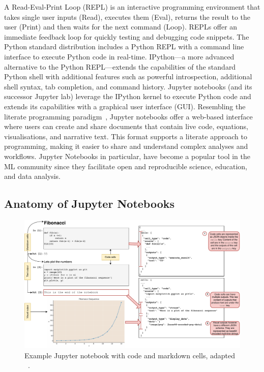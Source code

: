 A Read-Eval-Print Loop (REPL) is an interactive programming environment that takes single user inputs (Read), executes them (Eval), returns the result to the user (Print) and then waits for the next command (Loop). REPLs offer an immediate feedback loop for quickly testing and debugging code snippets. The Python standard distribution includes a Python REPL with a command line interface to execute Python code in real-time. IPython---a more advanced alternative to the Python REPL---extends the capabilities of the standard Python shell with additional features such as powerful introspection, additional shell syntax, tab completion, and command history. Jupyter notebooks (and its successor Jupyter lab) leverage the IPython kernel to execute Python code and extends its capabilities with a graphical user interface (GUI). Resembling the literate programming paradigm~\cite{knuth1984literate}, Jupyter notebooks offer a web-based interface where users can create and share documents that contain live code, equations, visualisations, and narrative text. This format supports a literate approach to programming, making it easier to share and understand complex analyses and workflows. Jupyter Notebooks in particular, have become a popular tool in the ML community since they facilitate open and reproducible science, education, and data analysis.

\subsection{Anatomy of Jupyter Notebooks}

\begin{figure}
  \centering
  \includegraphics[width=\linewidth]{nb.pdf}
  \caption{Example Jupyter notebook with code and markdown cells, adapted ~\cite[Figure~1]{pimentel2019large-scale}.}
  \label{fig:nb}
\end{figure}

